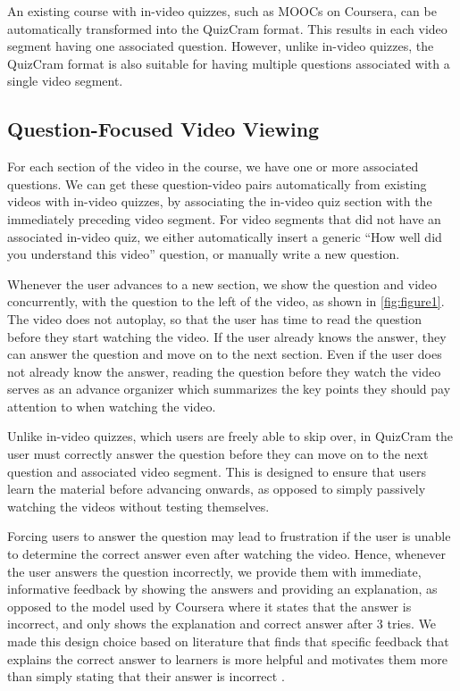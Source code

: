 \documentclass{chi-ext}
\begin{document}
An existing course with in-video quizzes, such as MOOCs on Coursera, can be automatically transformed into the QuizCram format. This results in each video segment having one associated question. However, unlike in-video quizzes, the QuizCram format is also suitable for having multiple questions associated with a single video segment.


\subsection{Question-Focused Video Viewing}
For each section of the video in the course, we have one or more associated questions. We can get these question-video pairs automatically from existing videos with in-video quizzes, by associating the in-video quiz section with the immediately preceding video segment. For video segments that did not have an associated in-video quiz, we either automatically insert a generic ``How well did you understand this video'' question, or manually write a new question.

Whenever the user advances to a new section, we show the question and video concurrently, with the question to the left of the video, as shown in \autoref{fig:figure1}. The video does not autoplay, so that the user has time to read the question before they start watching the video. If the user already knows the answer, they can answer the question and move on to the next section. Even if the user does not already know the answer, reading the question before they watch the video serves as an advance organizer which summarizes the key points they should pay attention to when watching the video.

Unlike in-video quizzes, which users are freely able to skip over, in QuizCram the user must correctly answer the question before they can move on to the next question and associated video segment. This is designed to ensure that users learn the material before advancing onwards, as opposed to simply passively watching the videos without testing themselves.

Forcing users to answer the question may lead to frustration if the user is unable to determine the correct answer even after watching the video. Hence, whenever the user answers the question incorrectly, we provide them with immediate, informative feedback by showing the answers and providing an explanation, as opposed to the model used by Coursera where it states that the answer is incorrect, and only shows the explanation and correct answer after 3 tries. We made this design choice based on literature that finds that specific feedback that explains the correct answer to learners is more helpful and motivates them more than simply stating that their answer is incorrect \cite{formativefeedback}.
\end{document}
